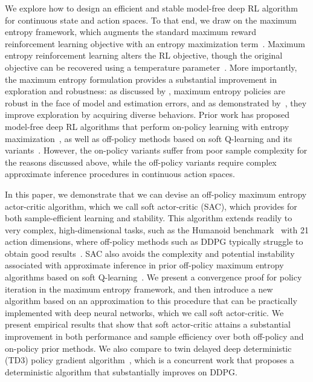 \documentclass{article}
\begin{document}
We explore how to design an efficient and stable model-free deep RL algorithm for continuous state and action spaces. To that end, we draw on the maximum entropy framework, which augments the standard maximum reward reinforcement learning objective with an entropy maximization term~\citep{ziebart2008maximum,toussaint2009robot,rawlik2012stochastic,fox2015taming,haarnoja2017reinforcement}.
Maximum entropy reinforcement learning alters the RL objective, though the original objective can be recovered using a temperature parameter~\citep{haarnoja2017reinforcement}.
More importantly, the maximum entropy formulation provides a substantial improvement in exploration and robustness: as discussed by \citet{ziebart2010modeling}, maximum entropy policies are robust in the face of model and estimation errors, and as demonstrated by~\cite{haarnoja2017reinforcement}, they improve exploration by acquiring diverse behaviors. Prior work has proposed model-free deep RL algorithms that perform on-policy learning with entropy maximization~\citep{o2016pgq}, as well as off-policy methods based on soft Q-learning and its variants~\citep{schulman2017equivalence, nachum2017bridging, haarnoja2017reinforcement}. However, the on-policy variants suffer from poor sample complexity for the reasons discussed above, while the off-policy variants require complex approximate inference procedures in continuous action spaces.

In this paper, we demonstrate that we can devise an off-policy maximum entropy actor-critic algorithm, which we call soft actor-critic (SAC), which provides for both sample-efficient learning and stability. This algorithm extends readily to very complex, high-dimensional tasks, such as the Humanoid benchmark~\citep{duan2016benchmarking} with 21 action dimensions, where off-policy methods such as DDPG typically struggle to obtain good results~\citep{gu2016q}. SAC also avoids the complexity and potential instability associated with approximate inference in prior off-policy maximum entropy algorithms based on soft Q-learning~\citep{haarnoja2017reinforcement}. We present a convergence proof for policy iteration in the maximum entropy framework, and then introduce a new algorithm based on an approximation to this procedure that can be practically implemented with deep neural networks, which we call soft actor-critic. We present empirical results that show that soft actor-critic attains a substantial improvement in both performance and sample efficiency over both off-policy and on-policy prior methods. We also compare to twin delayed deep deterministic (TD3) policy gradient algorithm~\citep{fujimoto2018addressing}, which is a concurrent work that proposes a deterministic algorithm that substantially improves on DDPG.
\end{document}

